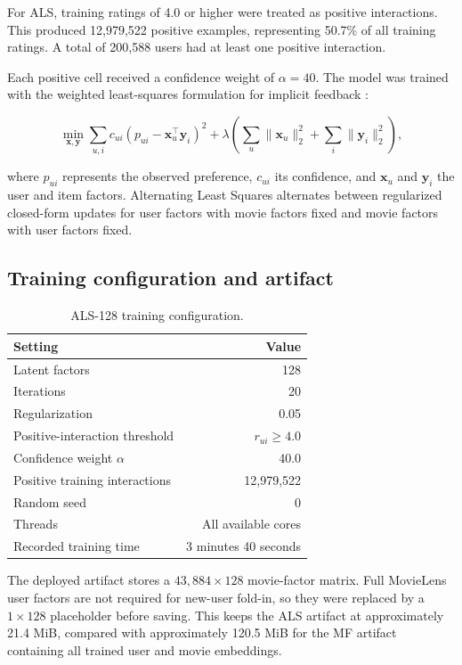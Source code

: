\documentclass[11pt,a4paper]{article}
\begin{document}
For ALS, training ratings of 4.0 or higher were treated as positive interactions. This produced 12,979,522 positive examples, representing 50.7\% of all training ratings. A total of 200,588 users had at least one positive interaction.

Each positive cell received a confidence weight of $\alpha=40$. The model was trained with the weighted least-squares formulation for implicit feedback \cite{hu2008implicit}:

\begin{equation}
\min_{\mathbf x,\mathbf y}
\sum_{u,i} c_{ui}\left(p_{ui}-\mathbf x_u^\top\mathbf y_i\right)^2
+ \lambda\left(\sum_u\|\mathbf x_u\|_2^2+\sum_i\|\mathbf y_i\|_2^2\right),
\end{equation}

where $p_{ui}$ represents the observed preference, $c_{ui}$ its confidence, and $\mathbf x_u$ and $\mathbf y_i$ the user and item factors. Alternating Least Squares alternates between regularized closed-form updates for user factors with movie factors fixed and movie factors with user factors fixed.

\subsection{Training configuration and artifact}

\begin{table}[H]
\centering
\caption{ALS-128 training configuration.}
\label{tab:alsconfig}
\begin{tabularx}{0.82\textwidth}{@{}Y r@{}}
\toprule
\textbf{Setting} & \textbf{Value} \\
\midrule
Latent factors & 128 \\
Iterations & 20 \\
Regularization & 0.05 \\
Positive-interaction threshold & $r_{ui}\geq4.0$ \\
Confidence weight $\alpha$ & 40.0 \\
Positive training interactions & 12,979,522 \\
Random seed & 0 \\
Threads & All available cores \\
Recorded training time & 3 minutes 40 seconds \\
\bottomrule
\end{tabularx}
\end{table}

The deployed artifact stores a $43{,}884 \times 128$ movie-factor matrix. Full MovieLens user factors are not required for new-user fold-in, so they were replaced by a $1 \times 128$ placeholder before saving. This keeps the ALS artifact at approximately 21.4 MiB, compared with approximately 120.5 MiB for the MF artifact containing all trained user and movie embeddings.
\end{document}
